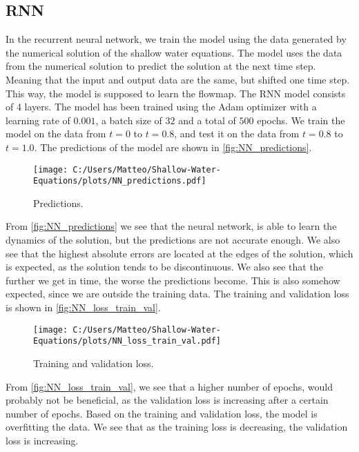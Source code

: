 \subsection{RNN}
In the recurrent neural network, we train the model using the data generated by the numerical solution of the shallow water equations.
The model uses the data from the numerical solution to predict the solution at the next time step.
Meaning that the input and output data are the same, but shifted one time step.
This way, the model is supposed to learn the flowmap.
The RNN model consists of 4 layers.
The model has been trained using the Adam optimizer with a learning rate of $0.001$, a batch size of $32$ and a total of $500$ epochs.
We train the model on the data from $t = 0$ to $t = 0.8$, and test it on the data from $t = 0.8$ to $t = 1.0$.
The predictions of the model are shown in \autoref{fig:NN_predictions}.
\begin{figure}[H]
    \centering
    \texttt{[image: C:/Users/Matteo/Shallow-Water-Equations/plots/NN\_predictions.pdf]}
    \caption{Predictions.}\label{fig:NN_predictions}
\end{figure}
From \autoref{fig:NN_predictions} we see that the neural network, is able to learn the dynamics of the solution, but the predictions are not accurate enough.
We also see that the highest absolute errors are located at the edges of the solution, which is expected, as the solution tends to be discontinuous.
We also see that the further we get in time, the worse the predictions become. This is also somehow expected, since we are outside the training data.
The training and validation loss is shown in \autoref{fig:NN_loss_train_val}.
\begin{figure}[H]
    \centering
    \texttt{[image: C:/Users/Matteo/Shallow-Water-Equations/plots/NN\_loss\_train\_val.pdf]}
    \caption{Training and validation loss.}\label{fig:NN_loss_train_val}
\end{figure}
From \autoref{fig:NN_loss_train_val}, we see that a higher number of epochs, would probably not be beneficial, as the validation loss is increasing after a certain number of epochs.
Based on the training and validation loss, the model is overfitting the data. We see that as the training loss is decreasing, the validation loss is increasing.
